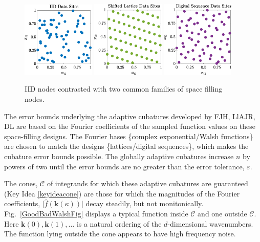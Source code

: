 \documentclass[11pt]{NSFamsart}
\newcommand{\hf}{\widehat{f}}
\newcommand{\bk}{{\boldsymbol{k}}}
\newcommand{\calc}{{\mathcal{C}}}
\newcommand{\bigabs}[1]{\ensuremath{\bigl \lvert #1 \bigr \rvert}}
\begin{document}
\begin{figure}[h] %
	\centering
	\includegraphics[width = 0.31\textwidth]{ProgramsImages/IIDPoints.eps} \quad
	\includegraphics[width = 0.31\textwidth]{ProgramsImages/ShiftedLatticePoints.eps}  \quad
	\includegraphics[width = 0.31\textwidth]{ProgramsImages/SSobolPoints.eps} 
	
	\caption{IID nodes contrasted with two common families of space filling nodes.\label{PtsFig}}
\end{figure}

The error bounds underlying the adaptive cubatures developed by FJH, LlAJR, DL are based on the Fourier coefficients of the sampled function values on these space-filling designs.  The Fourier bases \{complex exponential/Walsh functions\} are chosen to match the designs \{lattices/digital sequences\}, which makes the cubature error bounds possible.  The globally adaptive cubatures increase $n$ by powers of two until the error bounds are no greater than the error tolerance, $\varepsilon$.

The cones, $\calc$ of integrands for which these adaptive cubatures are guaranteed (Key Idea \ref{keyideacone})  are those for which the magnitudes of the Fourier coefficients, $\bigabs{\hf(\bk(\kappa))}$ decay steadily, but not monitonically.  Fig.\ \ref{GoodBadWalshFig} displays a typical function inside $\calc$ and one outside $\calc$. Here $\bk(0), \bk(1), \ldots$ is a natural ordering of the $d$-dimensional wavenumbers.  The function lying outside the cone appears to have high frequency noise. 
\end{document}
